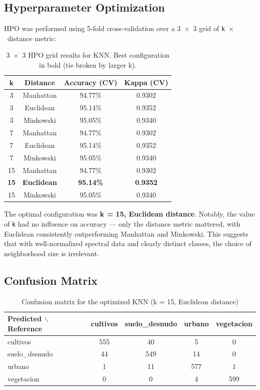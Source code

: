 \documentclass[12pt,a4paper]{article}
\begin{document}
\subsection{Hyperparameter Optimization}

HPO was performed using 5-fold cross-validation over a 3~$\times$~3 grid of \texttt{k}~$\times$~distance metric:

\begin{table}[H]
\centering
\begin{tabular}{|c|c|c|c|}
\hline
\textbf{k} & \textbf{Distance} & \textbf{Accuracy (CV)} & \textbf{Kappa (CV)} \\
\hline
 3 & Manhattan  & 94.77\% & 0.9302 \\
 3 & Euclidean  & 95.14\% & 0.9352 \\
 3 & Minkowski  & 95.05\% & 0.9340 \\
 7 & Manhattan  & 94.77\% & 0.9302 \\
 7 & Euclidean  & 95.14\% & 0.9352 \\
 7 & Minkowski  & 95.05\% & 0.9340 \\
15 & Manhattan  & 94.77\% & 0.9302 \\
\textbf{15} & \textbf{Euclidean}  & \textbf{95.14\%} & \textbf{0.9352} \\
15 & Minkowski  & 95.05\% & 0.9340 \\
\hline
\end{tabular}
\caption{3~$\times$~3 HPO grid results for KNN. Best configuration in bold (tie broken by larger k).}
\end{table}

The optimal configuration was \textbf{k = 15, Euclidean distance}. Notably, the value of \texttt{k} had no influence on accuracy — only the distance metric mattered, with Euclidean consistently outperforming Manhattan and Minkowski. This suggests that with well-normalized spectral data and clearly distinct classes, the choice of neighborhood size is irrelevant.

\subsection{Confusion Matrix}

\begin{table}[H]
\centering
\begin{tabular}{|l|c|c|c|c|}
\hline
\textbf{Predicted $\backslash$ Reference} & \textbf{cultivos} & \textbf{suelo\_desnudo} & \textbf{urbano} & \textbf{vegetacion} \\
\hline
cultivos       & 555 & 40 &  5 & 0 \\
\hline
suelo\_desnudo &  44 & 549 & 14 & 0 \\
\hline
urbano         &   1 &  11 & 577 & 1 \\
\hline
vegetacion     &   0 &   0 &  4 & 599 \\
\hline
\end{tabular}
\caption{Confusion matrix for the optimized KNN (k = 15, Euclidean distance)}
\end{table}
\end{document}
